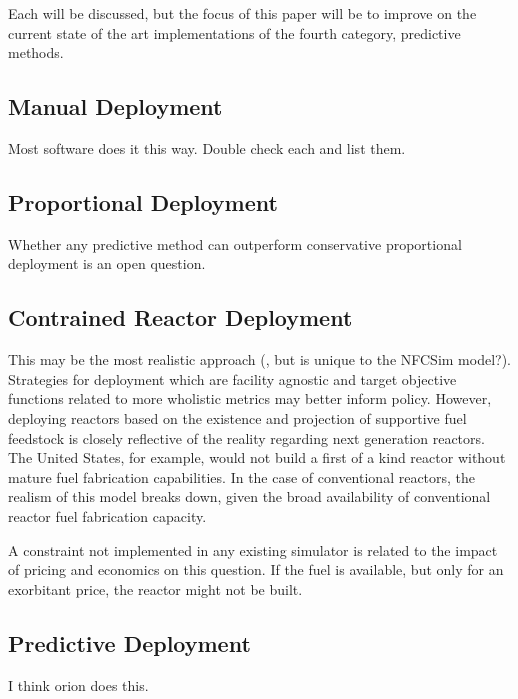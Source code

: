 Each will be discussed, but the focus of this paper will be to improve on the 
current state of the art implementations of the fourth category, predictive 
methods. 

\subsection{Manual Deployment}
Most software does it this way. Double check each and list them. 

\subsection{Proportional Deployment}

Whether any predictive method can outperform conservative proportional 
deployment is an open question. 

\subsection{Contrained Reactor Deployment}

This may be the most realistic approach (, but is unique to the NFCSim 
model?). Strategies for deployment which are facility agnostic and target 
objective functions related to more wholistic metrics may better inform policy. 
However, deploying reactors based on the existence and projection of supportive 
fuel feedstock is closely reflective of the reality regarding next generation 
reactors. The United States, for example, would not build a first of a kind 
reactor without mature fuel fabrication capabilities. In the case of 
conventional reactors, the realism of this model breaks down, given the broad 
availability of conventional reactor fuel fabrication capacity.  


A constraint not implemented in any existing simulator is related to the impact 
of pricing and economics on this question. If the fuel is available, but only 
for an exorbitant price, the reactor might not be built. 

\subsection{Predictive Deployment}
I think orion does this. 

